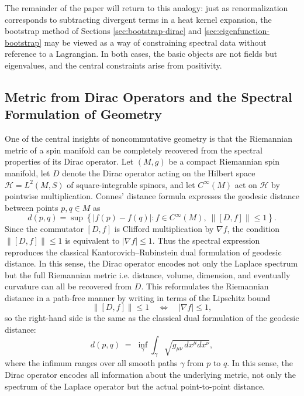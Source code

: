 \documentclass[11pt]{article}
\theoremstyle{plain}
\begin{document}
\medskip

The remainder of the paper will return to this analogy: just as renormalization corresponds to subtracting
divergent terms in a heat kernel expansion, the bootstrap method of Sections \ref{sec:bootstrap-dirac} and
\ref{sec:eigenfunction-bootstrap} may be viewed as a way of constraining spectral data without reference to
a Lagrangian. In both cases, the basic objects are not fields but eigenvalues, and the central constraints arise
from positivity.














\subsection{Metric from Dirac Operators and the Spectral Formulation of Geometry}
\label{sec:dirac-metric}

One of the central insights of noncommutative geometry is that the Riemannian metric of a spin
manifold can be completely recovered from the spectral properties of its Dirac operator.  Let
$(M,g)$ be a compact Riemannian spin manifold, let $D$ denote the Dirac operator acting on the
Hilbert space $\mathcal{H}=L^{2}(M,S)$ of square-integrable spinors, and let $C^{\infty}(M)$ act on
$\mathcal{H}$ by pointwise multiplication.  Connes' distance formula expresses the geodesic distance
between points $p,q\in M$ as
\[
d(p,q)
  = \sup\left\{
      |f(p)-f(q)| : f\in C^{\infty}(M),\ \|[D,f]\|\le 1
    \right\}.
\]
Since the commutator $[D,f]$ is Clifford multiplication by $\nabla f$, the condition
$\|[D,f]\|\le 1$ is equivalent to $|\nabla f|\le 1$.  Thus the spectral expression reproduces the
classical Kantorovich–Rubinstein dual formulation of geodesic distance.  In this sense, the Dirac
operator encodes not only the Laplace spectrum but the full Riemannian metric i.e. distance, volume,
dimension, and eventually curvature can all be recovered from $D$.  This  reformulates the Riemannian distance in a path-free manner by writing in terms of the Lipschitz bound
\[
\|[D,f]\| \le 1 \quad \Longleftrightarrow \quad |\nabla f| \le 1,
\]
so the right-hand side is the same as the classical dual formulation of the geodesic distance:
\[
d(p,q)
  \;=\;
  \inf_{\gamma} \int_\gamma \sqrt{g_{\mu\nu}\, dx^\mu dx^\nu},
\]
where the infimum ranges over all smooth paths $\gamma$ from $p$ to $q$. In this sense, the Dirac operator
encodes all information about the underlying metric, not only the spectrum of the Laplace operator but the
actual point-to-point distance.
\end{document}
